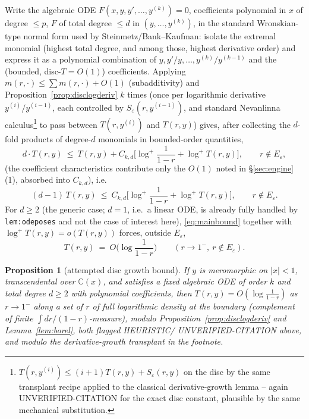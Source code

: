 \documentclass[11pt]{article}
\newtheorem{proposition}[theorem]{Proposition}
\theoremstyle{remark}
\newcommand{\C}{\mathbb C}
\begin{document}
Write the algebraic ODE $F(x,y,y',\ldots,y^{(k)})=0$, coefficients polynomial in $x$ of degree
$\le p$, $F$ of total degree $\le d$ in $(y,\ldots,y^{(k)})$, in the standard Wronskian-type
normal form used by Steinmetz/Bank--Kaufman: isolate the extremal monomial (highest total degree,
and among those, highest derivative order) and express it as a polynomial combination of
$y,y'/y,\ldots,y^{(k)}/y^{(k-1)}$ and the (bounded, disc-$T=O(1)$) coefficients. Applying
$m(r,\cdot)\le\sum m(r,\cdot)+O(1)$ (subadditivity) and Proposition~\ref{prop:disclogderiv} $k$
times (once per logarithmic derivative $y^{(i)}/y^{(i-1)}$, each controlled by
$S_\varepsilon(r,y^{(i-1)})$, and standard Nevanlinna calculus\footnote{$T(r,y^{(i)})\le(i+1)T(r,y)+S_\varepsilon(r,y)$ on the disc by the same transplant recipe applied to the classical derivative-growth lemma -- again UNVERIFIED-CITATION for the exact disc constant, plausible by the same mechanical substitution.} to pass between $T(r,y^{(i)})$ and
$T(r,y)$) gives, after collecting the $d$-fold products of degree-$d$ monomials in bounded-order
quantities,
\[
d\cdot T(r,y)\ \le\ T(r,y)+C_{k,d}\Big[\log^+\frac1{1-r}+\log^+T(r,y)\Big],\qquad r\notin E_\varepsilon,
\]
(the coefficient characteristics contribute only the $O(1)$ noted in \S\ref{sec:engine}(1), absorbed
into $C_{k,d}$), i.e.
\begin{equation}\label{eq:mainbound}
(d-1)\,T(r,y)\ \le\ C_{k,d}\Big[\log^+\frac1{1-r}+\log^+T(r,y)\Big],\qquad r\notin E_\varepsilon.
\end{equation}
For $d\ge2$ (the generic case; $d=1$, i.e.\ a linear ODE, is already fully handled by
\texttt{lem:odeposes} and not the case of interest here), \eqref{eq:mainbound} together with
$\log^+T(r,y)=o(T(r,y))$ forces, outside $E_\varepsilon$,
\begin{equation}\label{eq:finalbound}
T(r,y)\ =\ O\Big(\log\frac1{1-r}\Big)\qquad(r\to1^-,\ r\notin E_\varepsilon).
\end{equation}

\begin{proposition}[attempted disc growth bound]\label{prop:discbound}
If $y$ is meromorphic on $|x|<1$, transcendental over $\C(x)$, and satisfies a fixed algebraic ODE
of order $k$ and total degree $d\ge2$ with polynomial coefficients, then
$T(r,y)=O(\log\frac1{1-r})$ as $r\to1^-$ along a set of $r$ of full logarithmic density at the
boundary (complement of finite $\int dr/(1-r)$-measure), \emph{modulo}
Proposition~\ref{prop:disclogderiv} and Lemma~\ref{lem:borel}, both flagged HEURISTIC/
UNVERIFIED-CITATION above, and modulo the derivative-growth transplant in the footnote.
\end{proposition}
\end{document}

